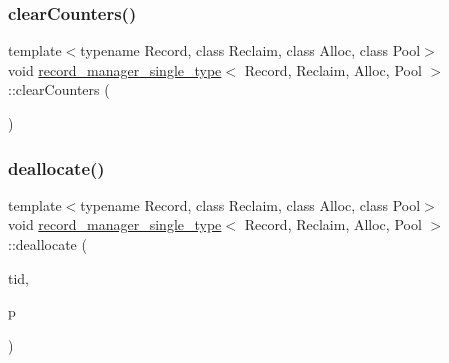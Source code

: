 \mbox{\label{classrecord__manager__single__type_a14bb98b1b90c16e99591d2a3f987f0c4}} 
\subsubsection{\texorpdfstring{clear\+Counters()}{clearCounters()}}
{\footnotesize\ttfamily template$<$typename Record, class Reclaim, class Alloc, class Pool$>$ \\
void \hyperlink{classrecord__manager__single__type}{record\+\_\+manager\+\_\+single\+\_\+type}$<$ Record, Reclaim, Alloc, Pool $>$\+::clear\+Counters (\begin{DoxyParamCaption}\item[{void}]{ }\end{DoxyParamCaption})\hspace{0.3cm}{\ttfamily [inline]}}

\mbox{\label{classrecord__manager__single__type_aa689188fd51bcab9f31aafaee82e054c}} 
\subsubsection{\texorpdfstring{deallocate()}{deallocate()}}
{\footnotesize\ttfamily template$<$typename Record, class Reclaim, class Alloc, class Pool$>$ \\
void \hyperlink{classrecord__manager__single__type}{record\+\_\+manager\+\_\+single\+\_\+type}$<$ Record, Reclaim, Alloc, Pool $>$\+::deallocate (\begin{DoxyParamCaption}\item[{const int}]{tid,  }\item[{\hyperlink{classrecord__manager__single__type_a065f05d1a84e619758122b3da04b1327}{record\+\_\+pointer}}]{p }\end{DoxyParamCaption})\hspace{0.3cm}{\ttfamily [inline]}}

